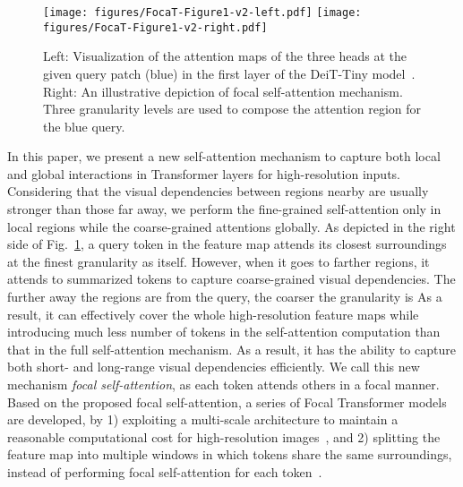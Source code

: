 \documentclass{article}
\begin{document}
\begin{figure}[t!]
\centering
    \texttt{[image: figures/FocaT-Figure1-v2-left.pdf]}
    \quad
    \texttt{[image: figures/FocaT-Figure1-v2-right.pdf]}
    \vspace{-3mm}
  \caption{Left: Visualization of the attention maps of the three heads at the given query patch (blue) in the first layer of the DeiT-Tiny model~\cite{touvron2020training}. Right: An illustrative depiction of focal self-attention mechanism. Three granularity levels are used to compose the attention region for the blue query.}
  \label{fig:teaser_fig}
  \vspace{-4mm}
\end{figure}

In this paper, we present a new self-attention mechanism to capture both local and global interactions in Transformer layers for high-resolution inputs. Considering that the visual dependencies between regions nearby are usually stronger than those far away, we perform the fine-grained self-attention only in local regions while the coarse-grained attentions globally. 
As depicted in the right side of Fig.~\ref{fig:teaser_fig}, a query token in the feature map attends its closest surroundings at the finest granularity as itself. However, when it goes to farther regions, it attends to summarized tokens to capture coarse-grained visual dependencies. 
The further away the regions are from the query, the coarser the granularity is 
As a result, it can effectively cover the whole high-resolution feature maps while introducing much less number of tokens in the self-attention computation than that in the full self-attention mechanism. As a result, it has the ability to capture both short- and long-range visual dependencies efficiently.
We call this new mechanism {\it focal self-attention}, as each token attends others in a focal manner. 
Based on the proposed focal self-attention, a series of Focal Transformer models are developed, by 1) exploiting a multi-scale architecture to maintain a reasonable computational cost for high-resolution images~\cite{wang2021pyramid,wu2021cvt,liu2021swin,zhang2021multi}, and 2) splitting the feature map into multiple windows in which tokens share the same surroundings, instead of performing focal self-attention for each token~\cite{vaswani2021scaling,zhang2021multi,liu2021swin}. 
\end{document}
